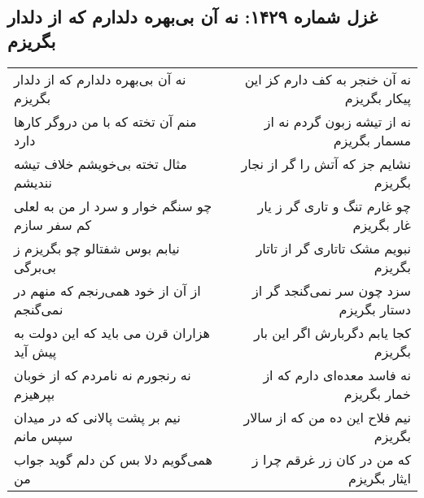 \begin{center}
\section*{غزل شماره ۱۴۲۹: نه آن بی‌بهره دلدارم که از دلدار بگریزم}
\label{sec:1429}
\begin{longtable}{l p{0.5cm} r}
نه آن بی‌بهره دلدارم که از دلدار بگریزم
&&
نه آن خنجر به کف دارم کز این پیکار بگریزم
\\
منم آن تخته که با من دروگر کارها دارد
&&
نه از تیشه زبون گردم نه از مسمار بگریزم
\\
مثال تخته بی‌خویشم خلاف تیشه نندیشم
&&
نشایم جز که آتش را گر از نجار بگریزم
\\
چو سنگم خوار و سرد ار من به لعلی کم سفر سازم
&&
چو غارم تنگ و تاری گر ز یار غار بگریزم
\\
نیابم بوس شفتالو چو بگریزم ز بی‌برگی
&&
نبویم مشک تاتاری گر از تاتار بگریزم
\\
از آن از خود همی‌رنجم که منهم در نمی‌گنجم
&&
سزد چون سر نمی‌گنجد گر از دستار بگریزم
\\
هزاران قرن می باید که این دولت به پیش آید
&&
کجا یابم دگربارش اگر این بار بگریزم
\\
نه رنجورم نه نامردم که از خوبان بپرهیزم
&&
نه فاسد معده‌ای دارم که از خمار بگریزم
\\
نیم بر پشت پالانی که در میدان سپس مانم
&&
نیم فلاح این ده من که از سالار بگریزم
\\
همی‌گویم دلا بس کن دلم گوید جواب من
&&
که من در کان زر غرقم چرا ز ایثار بگریزم
\\
\end{longtable}
\end{center}
